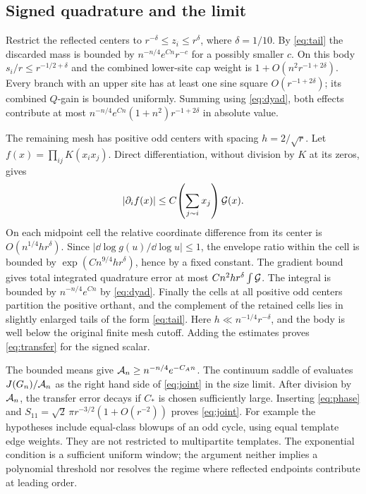 \subsection{Signed quadrature and the limit}
Restrict the reflected centers to \(r^{-\delta}\le z_i\le r^\delta\), where \(\delta=1/10\). By \eqref{eq:tail} the discarded mass is bounded by \(n^{-n/4}e^{Cn}r^{-c}\) for a possibly smaller \(c\). On this body \(s_i/r\le r^{-1/2+\delta}\) and
the combined lower-site cap weight is \(1+O(n^2r^{-1+2\delta})\). Every branch with an upper site has at least one sine square \(O(r^{-1+2\delta})\); its combined \(Q\)-gain is bounded uniformly. Summing using \eqref{eq:dyad}, both effects contribute at most \(n^{-n/4}e^{Cn}(1+n^2)r^{-1+2\delta}\) in absolute value.

The remaining mesh has positive odd centers with spacing \(h=2/\sqrt r\). Let \(f(x)=\prod_{ij}K(x_ix_j)\). Direct differentiation, without division by \(K\) at its zeros, gives
\[
        |\partial_i f(x)|\le C\!\left(\sum_{j\sim i}x_j\right){\cal G}(x).
\]
On each midpoint cell the relative coordinate difference from its center is \(O(n^{1/4}hr^\delta)\). Since \(|\dd\log g(u)/\dd\log u|\le1\), the envelope ratio within the cell is bounded by \(\exp(Cn^{9/4}hr^\delta)\), hence by a fixed constant. The gradient bound gives total integrated quadrature error at most \(Cn^2hr^\delta\int{\cal G}\). The integral is bounded by \(n^{-n/4}e^{Cn}\) by \eqref{eq:dyad}. Finally the cells at all positive odd centers partition the positive orthant, and the complement of the retained cells lies in slightly enlarged tails of the form \eqref{eq:tail}. Here \(h\ll n^{-1/4}r^{-\delta}\), and the body is well below the original finite mesh cutoff. Adding the estimates proves \eqref{eq:transfer} for the signed scalar.

The bounded means give \({\cal A}_n\ge n^{-n/4}e^{-C_A n}\).
The continuum saddle of \cite[Theorem~5.1]{P50} evaluates \(J(G_n)/{\cal A}_n\) as the right hand side of \eqref{eq:joint} in the size limit. After division by \({\cal A}_n\), the transfer error decays if \(C_*\) is chosen sufficiently large. Inserting \eqref{eq:phase} and \(S_{11}=\sqrt 2\,\pi r^{-3/2}(1+O(r^{-2}))\) proves \eqref{eq:joint}. For example the hypotheses include equal-class blowups of an odd cycle, using equal template edge weights. They are not restricted to multipartite templates. The exponential condition is a sufficient uniform window; the argument neither implies a polynomial threshold nor resolves the regime where reflected endpoints contribute at leading order.
